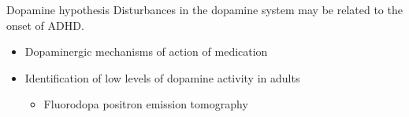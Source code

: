 \documentclass{beamer}
\begin{document}
\begin{frame}{Dopamine hypothesis}
    Disturbances in the dopamine system may be related to the onset of ADHD.

    \begin{itemize}
        \item Dopaminergic mechanisms of action of medication
        \item Identification of low levels of dopamine activity in adults
        \begin{itemize}
            \item Fluorodopa positron emission tomography
        \end{itemize}
    \end{itemize}
\end{frame}
\end{document}
